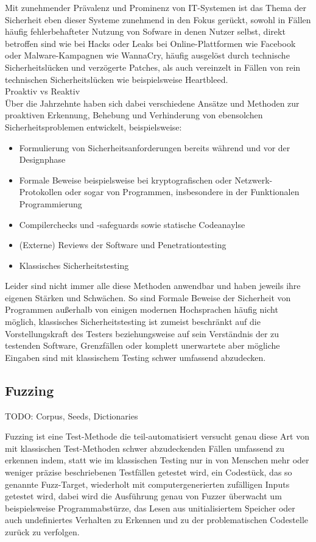 \documentclass[12pt]{scrartcl}
\begin{document}
Mit zunehmender Prävalenz und Prominenz von IT-Systemen ist das Thema der Sicherheit eben dieser Systeme zunehmend in den Fokus gerückt, sowohl in Fällen häufig fehlerbehafteter Nutzung von Sofware in denen Nutzer selbst, direkt betroffen sind wie bei Hacks oder Leaks bei Online-Plattformen wie Facebook oder Malware-Kampagnen wie WannaCry, häufig ausgelöst durch technische Sicherheitslücken und verzögerte Patches, als auch vereinzelt in Fällen von rein technischen Sicherheitslücken wie beispielsweise Heartbleed.\\
Proaktiv vs Reaktiv\\
Über die Jahrzehnte haben sich dabei verschiedene Ansätze und Methoden zur proaktiven Erkennung, Behebung und Verhinderung von ebensolchen Sicherheitsproblemen entwickelt, beispielsweise:
\begin{itemize}
\item Formulierung von Sicherheitsanforderungen bereits während und vor der Designphase
\item Formale Beweise beispielsweise bei kryptografischen oder Netzwerk-Protokollen oder sogar von Programmen, insbesondere in der Funktionalen Programmierung
\item Compilerchecks und -safeguards sowie statische Codeanaylse
\item (Externe) Reviews der Software und Penetrationtesting
\item Klassisches Sicherheitstesting
\end{itemize}
Leider sind nicht immer alle diese Methoden anwendbar und haben jeweils ihre eigenen Stärken und Schwächen. So sind Formale Beweise der Sicherheit von Programmen außerhalb von einigen modernen Hochsprachen häufig nicht möglich, klassisches Sicherheitstesting ist zumeist beschränkt auf die Vorstellungskraft des Testers beziehungsweise auf sein Verständnis der zu testenden Software, Grenzfällen oder komplett unerwartete aber mögliche Eingaben sind mit klassischem Testing schwer umfassend abzudecken.\\

\subsection{Fuzzing}

TODO: Corpus, Seeds, Dictionaries

Fuzzing ist eine Test-Methode die teil-automatisiert versucht genau diese Art von mit klassischen Test-Methoden schwer abzudeckenden Fällen umfassend zu erkennen indem, statt wie im klassischen Testing nur in von Menschen mehr oder weniger präzise beschriebenen Testfällen getestet wird, ein Codestück, das so genannte Fuzz-Target, wiederholt mit computergenerierten zufälligen Inputs getestet wird, dabei wird die Ausführung genau von Fuzzer überwacht um beispielsweise Programmabstürze, das Lesen aus unitialisiertem Speicher oder auch undefiniertes Verhalten zu Erkennen und zu der problematischen Codestelle zurück zu verfolgen.
\end{document}
